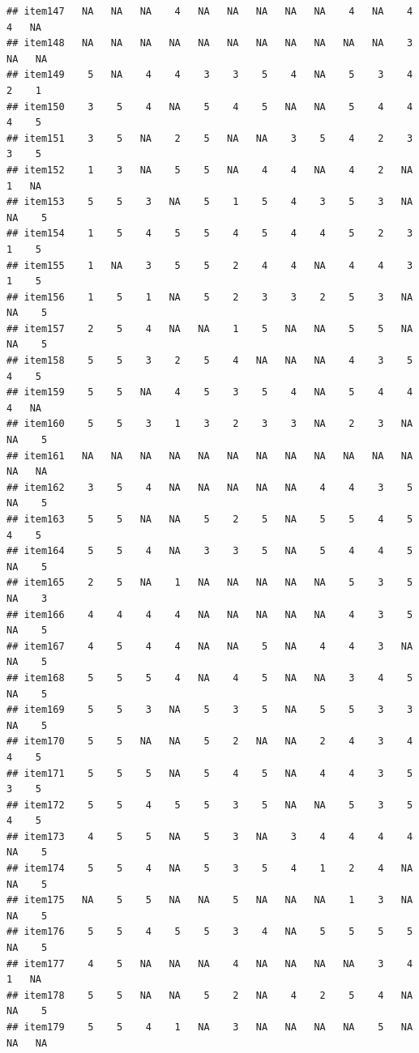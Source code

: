 \documentclass[
  man]{apa6}
\begin{document}
\begin{verbatim}
## item147   NA   NA   NA    4   NA   NA   NA   NA   NA    4   NA    4    4   NA
## item148   NA   NA   NA   NA   NA   NA   NA   NA   NA   NA   NA    3   NA   NA
## item149    5   NA    4    4    3    3    5    4   NA    5    3    4    2    1
## item150    3    5    4   NA    5    4    5   NA   NA    5    4    4    4    5
## item151    3    5   NA    2    5   NA   NA    3    5    4    2    3    3    5
## item152    1    3   NA    5    5   NA    4    4   NA    4    2   NA    1   NA
## item153    5    5    3   NA    5    1    5    4    3    5    3   NA   NA    5
## item154    1    5    4    5    5    4    5    4    4    5    2    3    1    5
## item155    1   NA    3    5    5    2    4    4   NA    4    4    3    1    5
## item156    1    5    1   NA    5    2    3    3    2    5    3   NA   NA    5
## item157    2    5    4   NA   NA    1    5   NA   NA    5    5   NA   NA    5
## item158    5    5    3    2    5    4   NA   NA   NA    4    3    5    4    5
## item159    5    5   NA    4    5    3    5    4   NA    5    4    4    4   NA
## item160    5    5    3    1    3    2    3    3   NA    2    3   NA   NA    5
## item161   NA   NA   NA   NA   NA   NA   NA   NA   NA   NA   NA   NA   NA   NA
## item162    3    5    4   NA   NA   NA   NA   NA    4    4    3    5   NA    5
## item163    5    5   NA   NA    5    2    5   NA    5    5    4    5    4    5
## item164    5    5    4   NA    3    3    5   NA    5    4    4    5   NA    5
## item165    2    5   NA    1   NA   NA   NA   NA   NA    5    3    5   NA    3
## item166    4    4    4    4   NA   NA   NA   NA   NA    4    3    5   NA    5
## item167    4    5    4    4   NA   NA    5   NA    4    4    3   NA   NA    5
## item168    5    5    5    4   NA    4    5   NA   NA    3    4    5   NA    5
## item169    5    5    3   NA    5    3    5   NA    5    5    3    3   NA    5
## item170    5    5   NA   NA    5    2   NA   NA    2    4    3    4    4    5
## item171    5    5    5   NA    5    4    5   NA    4    4    3    5    3    5
## item172    5    5    4    5    5    3    5   NA   NA    5    3    5    4    5
## item173    4    5    5   NA    5    3   NA    3    4    4    4    4   NA    5
## item174    5    5    4   NA    5    3    5    4    1    2    4   NA   NA    5
## item175   NA    5    5   NA   NA    5   NA   NA   NA    1    3   NA   NA    5
## item176    5    5    4    5    5    3    4   NA    5    5    5    5   NA    5
## item177    4    5   NA   NA   NA    4   NA   NA   NA   NA    3    4    1   NA
## item178    5    5   NA   NA    5    2   NA    4    2    5    4   NA   NA    5
## item179    5    5    4    1   NA    3   NA   NA   NA   NA    5   NA   NA   NA

\end{verbatim}
\end{document}
